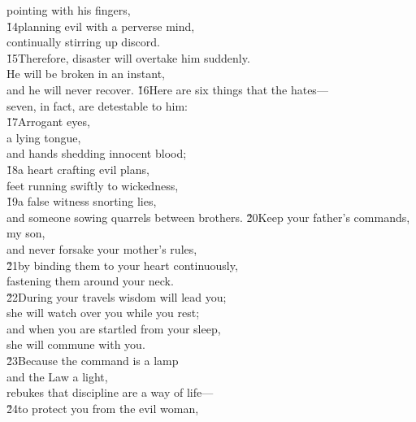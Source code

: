 \begin{poetry}
\poemll    pointing with his fingers, \\
\poeml \v{14}planning evil with a perverse mind, \\
\poemll    continually stirring up discord. \\
\poeml \v{15}Therefore, disaster will overtake him suddenly. \\
\poemll    He will be broken in an instant, \\
\poemlll       and he will never recover.
\poeml \v{16}Here are six things that the  hates--- \\
\poemll    seven, in fact, are detestable to him: \\
\poeml \v{17}Arrogant eyes, \\
\poemll    a lying tongue, \\
\poemlll       and hands shedding innocent blood; \\
\poeml \v{18}a heart crafting evil plans, \\
\poemll    feet running swiftly to wickedness, \\
\poeml \v{19}a false witness snorting lies, \\
\poemll    and someone sowing quarrels between brothers.
\poeml \v{20}Keep your father's commands, my son, \\
\poemll    and never forsake your mother's rules, \\
\poeml \v{21}by binding them to your heart continuously, \\
\poemll    fastening them around your neck. \\
\poeml \v{22}During your travels wisdom will lead you; \\
\poemll    she will watch over you while you rest; \\
\poeml and when you are startled from your sleep, \\
\poemll    she will commune with you. \\
\poeml \v{23}Because the command is a lamp \\
\poemll    and the Law a light, \\
\poemlll       rebukes that discipline are a way of life--- \\
\poeml \v{24}to protect you from the evil woman, \\

\end{poetry}
